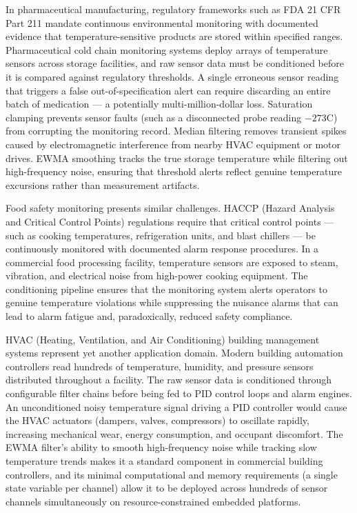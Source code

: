 In pharmaceutical manufacturing, regulatory frameworks such as FDA 21 CFR Part 211 mandate continuous environmental monitoring with documented evidence that temperature-sensitive products are stored within specified ranges. Pharmaceutical cold chain monitoring systems deploy arrays of temperature sensors across storage facilities, and raw sensor data must be conditioned before it is compared against regulatory thresholds. A single erroneous sensor reading that triggers a false out-of-specification alert can require discarding an entire batch of medication --- a potentially multi-million-dollar loss. Saturation clamping prevents sensor faults (such as a disconnected probe reading $-273$\textdegree C) from corrupting the monitoring record. Median filtering removes transient spikes caused by electromagnetic interference from nearby HVAC equipment or motor drives. EWMA smoothing tracks the true storage temperature while filtering out high-frequency noise, ensuring that threshold alerts reflect genuine temperature excursions rather than measurement artifacts.

Food safety monitoring presents similar challenges. HACCP (Hazard Analysis and Critical Control Points) regulations require that critical control points --- such as cooking temperatures, refrigeration units, and blast chillers --- be continuously monitored with documented alarm response procedures. In a commercial food processing facility, temperature sensors are exposed to steam, vibration, and electrical noise from high-power cooking equipment. The conditioning pipeline ensures that the monitoring system alerts operators to genuine temperature violations while suppressing the nuisance alarms that can lead to alarm fatigue and, paradoxically, reduced safety compliance.

HVAC (Heating, Ventilation, and Air Conditioning) building management systems represent yet another application domain. Modern building automation controllers read hundreds of temperature, humidity, and pressure sensors distributed throughout a facility. The raw sensor data is conditioned through configurable filter chains before being fed to PID control loops and alarm engines. An unconditioned noisy temperature signal driving a PID controller would cause the HVAC actuators (dampers, valves, compressors) to oscillate rapidly, increasing mechanical wear, energy consumption, and occupant discomfort. The EWMA filter's ability to smooth high-frequency noise while tracking slow temperature trends makes it a standard component in commercial building controllers, and its minimal computational and memory requirements (a single state variable per channel) allow it to be deployed across hundreds of sensor channels simultaneously on resource-constrained embedded platforms.
